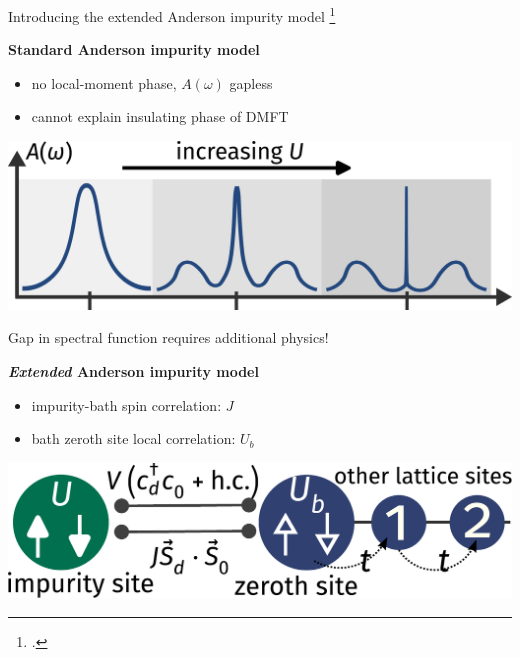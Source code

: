 \documentclass[8pt,aspectratio=169]{beamer}
\newcommand{\nitem}{\item[\ding{51}]}
\begin{document}
\begin{frame}{Introducing the extended Anderson impurity model}
\footcite{anderson_1961,anderson_1978,wilson1974,nozieres1974fermi,hrk_wilson_1980,andrei_1980,tsvelickKondoreview,hewson1993,costi_hewson_1990,costi2000,kuramoto1987,Cox1988}

\begin{minipage}{0.5\textwidth}
{\bf Standard Anderson impurity model\\}
\begin{itemize}
	\nitem no local-moment phase, \(A(\omega)\) gapless
	\nitem cannot explain insulating phase of DMFT
\end{itemize}
\end{minipage}
\hspace*{\fill}
\begin{minipage}{0.45\textwidth}
\includegraphics[width=\textwidth]{standard-siam.pdf}
\end{minipage}

\vspace*{20pt}

\alert{Gap in spectral function requires additional physics!}

\vspace*{20pt}

\begin{minipage}{0.5\textwidth}
\textbf{{\it Extended} Anderson impurity model\\}
\begin{itemize}
\nitem impurity-bath spin correlation: \(J\)
\nitem bath zeroth site local correlation: \(U_b\)
\end{itemize}
\end{minipage}
\hspace*{\fill}
\begin{minipage}{0.48\textwidth}
\includegraphics[width=\textwidth]{zeromode_bare.pdf}
\end{minipage}

\end{frame}
\end{document}
